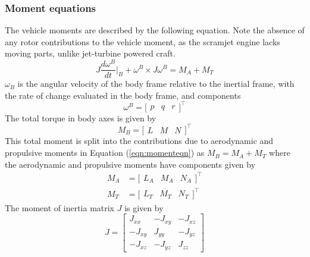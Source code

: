 \subsubsection*{Moment equations}

The vehicle moments are described by the following equation.
Note the absence of any rotor contributions to the vehicle moment, as the scramjet engine lacks moving parts, unlike jet-turbine powered craft.
\begin{equation}
  \label{eqn:momenteqn}
  J\frac{d\omega^{B}}{dt}\biggr|_{B}+\omega^{B}\times J\omega^{B}=M_{A}+M_{T}
\end{equation}
$\omega_{B}$ is the angular velocity of the body frame relative to the inertial frame, with the rate of change evaluated in the body frame, and components
\begin{equation}
  \omega^{B}=
  \bigr[
  \begin{array}{ccc}
    p & q & r
  \end{array}\bigr]^{\top}
\end{equation}
The total torque in body axes is given by
\begin{equation}
  M_{B}=
  \bigr[
  \begin{array}{ccc}
    L & M & N
  \end{array}\bigr]^{\top}
\end{equation}
This total moment is split into the contributions due to aerodynamic and propulsive moments in Equation (\ref{eqn:momenteqn}) as $M_{B}=M_{A}+M_{T}$ where the aerodynamic and propulsive moments have components given by
\begin{equation}
  \begin{split}
    M_{A}&=
    \bigr[
    \begin{array}{ccc}
      L_{A} & M_{A} & N_{A}
    \end{array}\bigr]^{\top} \\
    M_{T}&=
    \bigr[
    \begin{array}{ccc}
      L_{T} & M_{T} & N_{T}
    \end{array}\bigr]^{\top}
  \end{split}
\end{equation}
The moment of inertia matrix $J$ is given by
\begin{equation}
  J=
  \begin{bmatrix}
    J_{xx} & -J_{xy} & -J_{xz} \\
    -J_{xy} & J_{yy} & -J_{yz} \\
    -J_{xz} & -J_{yz} & J_{zz}
  \end{bmatrix}
\end{equation}
